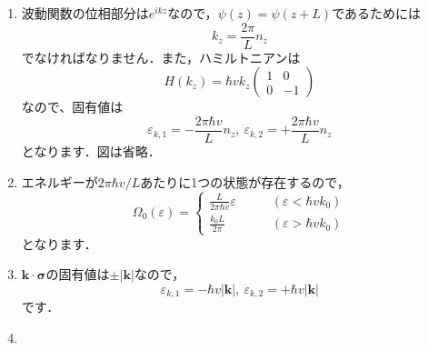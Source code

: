 \documentclass[a4paper,pdflatex,ja=standard]{bxjsarticle}
\begin{document}
\begin{enumerate}

  \item 

  波動関数の位相部分は$e^{ikz}$なので，$\psi(z)=\psi(z+L)$であるためには
  \begin{equation}
    k_z
    =
    \frac{2\pi}{L}n_z
  \end{equation}
  でなければなりません．また，ハミルトニアンは
  \begin{equation}
    H(k_z)
    =
    \hbar vk_z
    \begin{pmatrix}
      1 & 0 \\
      0 & -1
    \end{pmatrix}
  \end{equation}
  なので、固有値は
  \begin{equation}
    \varepsilon_{k,1}
    =
    -
    \frac{2\pi \hbar v}{L}n_z
    ,\ 
    \varepsilon_{k,2}
    =
    +
    \frac{2\pi \hbar v}{L}n_z
  \end{equation}
  となります．図は省略．


  \item 

  エネルギーが$2\pi\hbar v/L$あたりに1つの状態が存在するので，
  \begin{equation}
    \Omega_0(\varepsilon)
    =
    \left\{
      \begin{alignedat}{1}
        \frac{L}{2\pi\hbar v}\varepsilon
        \quad
        &
        \quad
        (\varepsilon<\hbar vk_0)
        \\
        \frac{k_0 L}{2\pi}
        \quad
        &
        \quad
        (\varepsilon>\hbar vk_0)
      \end{alignedat}
    \right.
  \end{equation}
  となります．


  \item

  $\bm{k}\cdot\bm{\sigma}$の固有値は$\pm|\bm{k}|$なので，
  \begin{equation}
    \varepsilon_{k,1}
    =
    -\hbar v|\bm{k}|
    ,\ 
    \varepsilon_{k,2}
    =
    +\hbar v|\bm{k}|
  \end{equation}
  です．


  \item 


\end{enumerate}
\end{document}

